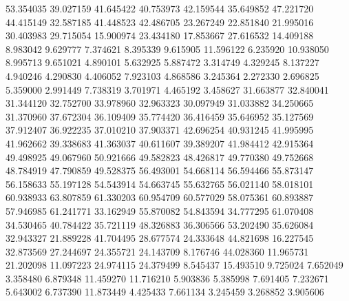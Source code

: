 53.354035
39.027159
41.645422
40.753973
42.159544
35.649852
47.221720
44.415149
32.587185
41.448523
42.486705
23.267249
22.851840
21.995016
30.403983
29.715054
15.900974
23.434180
17.853667
27.616532
14.409188
8.983042
9.629777
7.374621
8.395339
9.615905
11.596122
6.235920
10.938050
8.995713
9.651021
4.890101
5.632925
5.887472
3.314749
4.329245
8.137227
4.940246
4.290830
4.406052
7.923103
4.868586
3.245364
2.272330
2.696825
5.359000
2.991449
7.738319
3.701971
4.465192
3.458627
31.663877
32.840041
31.344120
32.752700
33.978960
32.963323
30.097949
31.033882
34.250665
31.370960
37.672304
36.109409
35.774420
36.416459
35.646952
35.127569
37.912407
36.922235
37.010210
37.903371
42.696254
40.931245
41.995995
41.962662
39.338683
41.363037
40.611607
39.389207
41.984412
42.915364
49.498925
49.067960
50.921666
49.582823
48.426817
49.770380
49.752668
48.784919
47.790859
49.528375
56.493001
54.668114
56.594466
55.873147
56.158633
55.197128
54.543914
54.663745
55.632765
56.021140
58.018101
60.938933
63.807859
61.330203
60.954709
60.577029
58.075361
60.893887
57.946985
61.241771
33.162949
55.870082
54.843594
34.777295
61.070408
34.530465
40.784422
35.721119
48.326883
36.306566
53.202490
35.626084
32.943327
21.889228
41.704495
28.677574
24.333648
44.821698
16.227545
32.873569
27.244697
24.355721
24.143709
8.176746
44.028360
11.965731
21.202098
11.097223
24.974115
24.379499
8.545437
15.493510
9.725024
7.652049
3.358480
6.879348
11.459270
11.716210
5.903836
5.385998
7.691405
7.232671
5.643002
6.737390
11.873449
4.425433
7.661134
3.245459
3.268852
3.905606